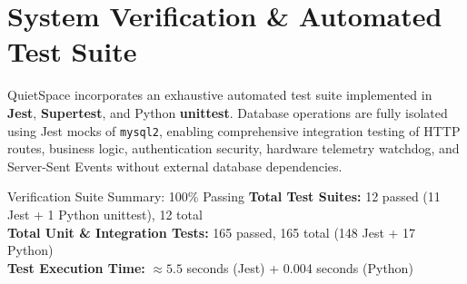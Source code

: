 \documentclass[11pt,a4paper]{article}
\begin{document}
\section{System Verification \& Automated Test Suite}

QuietSpace incorporates an exhaustive automated test suite implemented in \textbf{Jest}, \textbf{Supertest}, and Python \textbf{unittest}. Database operations are fully isolated using Jest mocks of \texttt{mysql2}, enabling comprehensive integration testing of HTTP routes, business logic, authentication security, hardware telemetry watchdog, and Server-Sent Events without external database dependencies.

\begin{calloutbox}{Verification Suite Summary: 100\% Passing}
\textbf{Total Test Suites:} 12 passed (11 Jest + 1 Python unittest), 12 total \\
\textbf{Total Unit \& Integration Tests:} 165 passed, 165 total (148 Jest + 17 Python) \\
\textbf{Test Execution Time:} $\approx 5.5$ seconds (Jest) + 0.004 seconds (Python)
\end{calloutbox}
\end{document}
